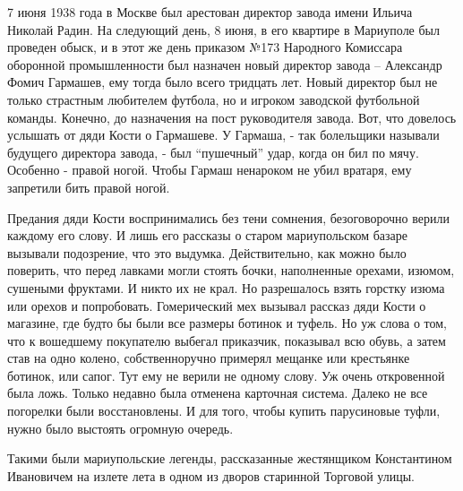 7 июня 1938 года в Москве был арестован директор завода имени Ильича Николай
Радин. На следующий день, 8 июня, в его квартире в Мариуполе был проведен
обыск, и в этот же день приказом №173 Народного Комиссара оборонной
промышленности был назначен новый директор завода – Александр Фомич Гармашев,
ему тогда было всего тридцать лет. Новый директор был не только страстным
любителем футбола, но и игроком заводской футбольной команды. Конечно, до
назначения на пост руководителя завода. Вот, что довелось услышать от дяди
Кости о Гармашеве.  У Гармаша, - так болельщики называли будущего директора
завода, - был \enquote{пушечный} удар, когда он бил по мячу. Особенно - правой ногой.
Чтобы Гармаш ненароком не убил вратаря, ему запретили бить правой ногой.

Предания дяди Кости воспринимались без тени сомнения, безоговорочно верили
каждому его слову. И лишь его рассказы о старом мариупольском базаре вызывали
подозрение, что это выдумка. Действительно, как можно было поверить, что перед
лавками могли стоять бочки, наполненные орехами, изюмом, сушеными фруктами. И
никто их не крал. Но разрешалось взять горстку изюма или орехов и попробовать.
Гомерический мех вызывал рассказ дяди Кости о магазине, где будто бы были все
размеры ботинок и туфель. Но уж слова о том, что к вошедшему покупателю выбегал
приказчик, показывал всю обувь, а затем став на одно колено, собственноручно
примерял мещанке или крестьянке ботинок, или сапог. Тут ему не верили не одному
слову. Уж очень откровенной была ложь. Только недавно была отменена карточная
система. Далеко не все погорелки были восстановлены. И для того, чтобы купить
парусиновые туфли, нужно было выстоять огромную очередь.

Такими были мариупольские легенды, рассказанные жестянщиком Константином
Ивановичем на излете лета в одном из дворов старинной Торговой улицы. 

